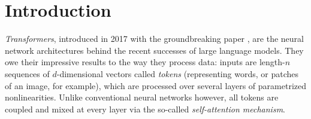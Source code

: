 \documentclass[a4paper,11pt]{article}
\theoremstyle{plain}
\numberwithin{equation}{section}
\begin{document}
\section{Introduction}

\emph{Transformers}, introduced in 2017 with the groundbreaking paper \cite{vaswani2017attention}, are the neural network architectures behind the recent successes of large language models. They owe their impressive results to the way they process data: inputs are length-$n$ sequences of $d$-dimensional vectors called \emph{tokens} (representing words, or patches of an image, for example), which are processed over several layers of parametrized nonlinearities. Unlike conventional neural networks however, all tokens are coupled and mixed at every layer via the so-called \emph{self-attention mechanism}. 
\end{document}
